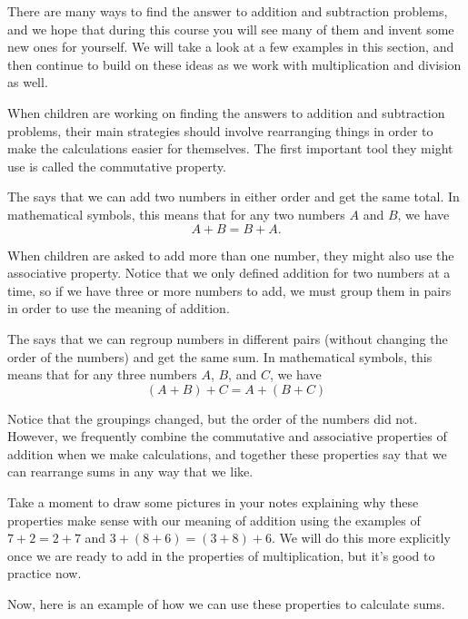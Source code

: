 \documentclass{ximera}
\begin{document}
There are many ways to find the answer to addition and subtraction problems, and we hope that during this course you will see many of them and invent some new ones for yourself. We will take a look at a few examples in this section, and then continue to build on these ideas as we work with multiplication and division as well. 

When children are working on finding the answers to addition and subtraction problems, their main strategies should involve rearranging things in order to make the calculations easier for themselves. The first important tool they might use is called the commutative property.

\begin{definition}
The  says that we can add two numbers in either order and get the same total. In mathematical symbols, this means that for any two numbers $A$ and $B$, we have
\[
A + B = B + A.
\]
\end{definition}

When children are asked to add more than one number, they might also use the associative property. Notice that we only defined addition for two numbers at a time, so if we have three or more numbers to add, we must group them in pairs in order to use the meaning of addition.
\begin{definition}
The  says that we can regroup numbers in different pairs (without changing the order of the numbers) and get the same sum. In mathematical symbols, this means that for any three numbers $A$, $B$, and $C$, we have
\[
(A + B) + C = A + (B+C)
\]
\end{definition}
Notice that the groupings changed, but the order of the numbers did not. However, we frequently combine the commutative and associative properties of addition when we make calculations, and together these properties say that we can rearrange sums in any way that we like.

Take a moment to draw some pictures in your notes explaining why these properties make sense with our meaning of addition using the examples of $7+2 = 2+7$ and $3+(8+6) = (3+8)+6$. We will do this more explicitly once we are ready to add in the properties of multiplication, but it's good to practice now.

Now, here is an example of how we can use these properties to calculate sums.
\end{document}

